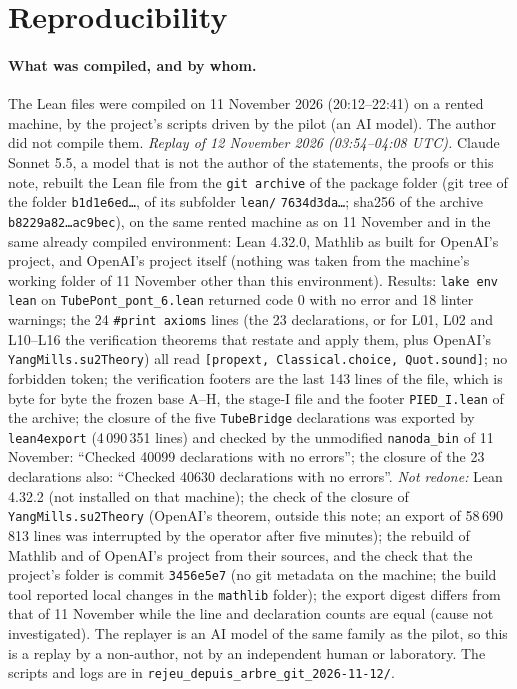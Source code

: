\documentclass[11pt,a4paper]{article}
\theoremstyle{plain}
\theoremstyle{definition}
\theoremstyle{remark}
\numberwithin{equation}{section}
\begin{document}
\section{Reproducibility}\label{sec:repro}
\paragraph{What was compiled, and by whom.} The Lean files were compiled on 11 November 2026 (20:12--22:41) on a rented machine, by the project's scripts driven by the pilot (an AI model). The author did not compile them. \emph{Replay of 12 November 2026 (03:54--04:08 UTC).} Claude Sonnet 5.5, a model that is not the author of the statements, the proofs or this note, rebuilt the Lean file from the \texttt{git archive} of the package folder (git tree of the folder \texttt{b1d1e6ed\dots}, of its subfolder \texttt{lean/} \texttt{7634d3da\dots}; sha256 of the archive \texttt{b8229a82\dots ac9bec}), on the same rented machine as on 11 November and in the same already compiled environment: Lean 4.32.0, Mathlib as built for OpenAI's project, and OpenAI's project itself (nothing was taken from the machine's working folder of 11 November other than this environment). Results: \texttt{lake env lean} on \texttt{TubePont\_pont\_6.lean} returned code 0 with no error and 18 linter warnings; the 24 \texttt{\#print axioms} lines (the 23 declarations, or for L01, L02 and L10--L16 the verification theorems that restate and apply them, plus OpenAI's \texttt{YangMills.su2Theory}) all read \texttt{[propext, Classical.choice, Quot.sound]}; no forbidden token; the verification footers are the last 143 lines of the file, which is byte for byte the frozen base A--H, the stage-I file and the footer \texttt{PIED\_I.lean} of the archive; the closure of the five \texttt{TubeBridge} declarations was exported by \texttt{lean4export} (4\,090\,351 lines) and checked by the unmodified \texttt{nanoda\_bin} of 11 November: ``Checked 40099 declarations with no errors''; the closure of the 23 declarations also: ``Checked 40630 declarations with no errors''. \emph{Not redone:} Lean 4.32.2 (not installed on that machine); the check of the closure of \texttt{YangMills.su2Theory} (OpenAI's theorem, outside this note; an export of 58\,690\,813 lines was interrupted by the operator after five minutes); the rebuild of Mathlib and of OpenAI's project from their sources, and the check that the project's folder is commit \texttt{3456e5e7} (no git metadata on the machine; the build tool reported local changes in the \texttt{mathlib} folder); the export digest differs from that of 11 November while the line and declaration counts are equal (cause not investigated). The replayer is an AI model of the same family as the pilot, so this is a replay by a non-author, not by an independent human or laboratory. The scripts and logs are in \texttt{rejeu\_depuis\_arbre\_git\_2026-11-12/}.
\end{document}
